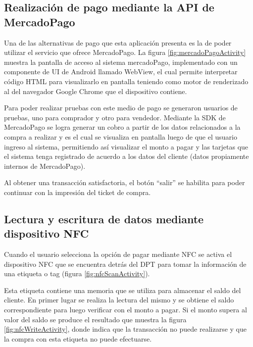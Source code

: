 
\subsection{Realizaci\'on de pago mediante la \ac{API} de MercadoPago}
\label{subsec:ui.addsale.nfc}

Una de las alternativas de pago que esta aplicaci\'on presenta es la de poder utilizar el servicio que ofrece MercadoPago. La figura \ref{fig:mercadoPagoActivity} muestra la pantalla de acceso al sistema mercadoPago, implementado con un componente de \ac{UI} de Android llamado WebView, el cual permite interpretar c\'odigo HTML para visualizarlo en pantalla teniendo como motor de renderizado al del navegador Google Chrome que el dispositivo contiene.

Para poder realizar pruebas con este medio de pago se generaron usuarios de pruebas, uno para comprador y otro para vendedor. Mediante la \ac{SDK} de MercadoPago se logra generar un cobro a partir de los datos relacionados a la compra a realizar y es el cual se visualiza en pantalla luego de que el usuario ingreso al sistema, permitiendo as\'i visualizar el monto a pagar y las tarjetas que el sistema tenga registrado de acuerdo a los datos del cliente (datos propiamente internos de MercadoPago).

Al obtener una transacci\'on satisfactoria, el bot\'on ``salir'' se habilita para poder continuar con la impresi\'on del ticket de compra.


\subsection{Lectura y escritura de datos mediante dispositivo \ac{NFC}}
\label{subsec:ui.addsale.nfc}

Cuando el usuario selecciona la opci\'on de pagar mediante \ac{NFC} se activa el dispositivo \ac{NFC} que se encuentra detr\'as del \ac{DPT} para tomar la informaci\'on de una etiqueta o tag (figura \ref{fig:nfcScanActivity}).

Esta etiqueta contiene una memoria que se utiliza para almacenar el saldo del cliente. En primer lugar se realiza la lectura del mismo y se obtiene el saldo correspondiente para luego verificar con el monto a pagar. Si el monto supera al valor del saldo se produce el resultado que muestra la figura \ref{fig:nfcWriteActivity}, donde indica que la transacci\'on no puede realizarse y que la compra con esta etiqueta no puede efectuarse.

